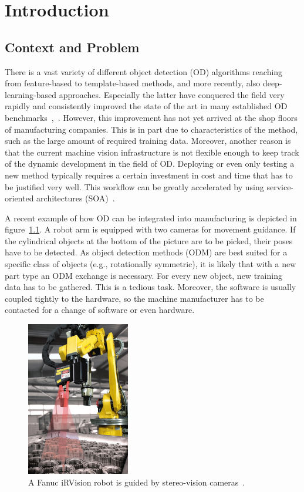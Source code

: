 \chapter{Introduction\label{cha:chapter1}}
\section{Context and Problem}
There is a vast variety of different object detection (OD) algorithms reaching from feature-based to template-based methods, and more recently, also deep-learning-based approaches. Especially the latter have conquered the field very rapidly and consistently improved the state of the art in many established OD benchmarks~\cite{Houben2013DetectionBenchmark},~\cite{Geiger2012AreSuite}. However, this improvement has not yet arrived at the shop floors of manufacturing companies. This is in part due to characteristics of the method, such as the large amount of required training data. Moreover, another reason is that the current machine vision infrastructure is not flexible enough to keep track of the dynamic development in the field of OD. Deploying or even only testing a new method typically requires a certain investment in cost and time that has to be justified very well. This workflow can be greatly accelerated by using service-oriented architectures (SOA)~\cite{Rudorfer2018IndustrialServices}.

A recent example of how OD can be integrated into manufacturing is depicted in figure~\ref{fig:fanuc}. A robot arm is equipped with two cameras for movement guidance. If the cylindrical objects at the bottom of the picture are to be picked, their poses have to be detected. As object detection methods (ODM) are best suited for a specific class of objects (e.g., rotationally symmetric), it is likely that with a new part type an ODM exchange is necessary. For every new object, new training data has to be gathered. This is a tedious task. Moreover, the software is usually coupled tightly to the hardware, so the machine manufacturer has to be contacted for a change of software or even hardware. 
\begin{figure}[ht]
    \centering
    \includegraphics[width=0.4\textwidth]{img/Fanuc_iRVision.png}
    \caption[Fanuc iRVision Robot]{A Fanuc iRVision robot is guided by stereo-vision cameras~\cite{Gonzalez2017Smart2019}.}
    \label{fig:fanuc}
\end{figure}

